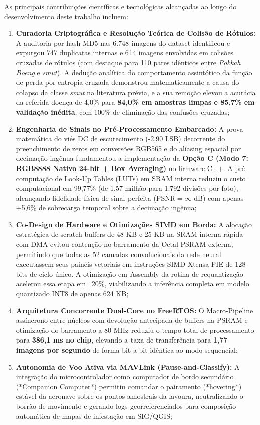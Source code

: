 As principais contribuições científicas e tecnológicas alcançadas ao longo do desenvolvimento deste trabalho incluem:
\begin{enumerate}
    \item \textbf{Curadoria Criptográfica e Resolução Teórica de Colisão de Rótulos:} A auditoria por hash MD5 nas 6.748 imagens do dataset identificou e expurgou 747 duplicatas internas e 614 imagens envolvidas em colisões cruzadas de rótulos (com destaque para 110 pares idênticos entre \textit{Pokkah Boeng} e \textit{smut}). A dedução analítica do comportamento assintótico da função de perda por entropia cruzada demonstrou matematicamente a causa do colapso da classe \textit{smut} na literatura prévia, e a sua remoção elevou a acurácia da referida doença de 4,0\% para \textbf{84,0\% em amostras limpas e 85,7\% em validação inédita}, com 100\% de eliminação das confusões cruzadas;
    \item \textbf{Engenharia de Sinais no Pré-Processamento Embarcado:} A prova matemática do viés DC de escurecimento (-2,90 LSB) decorrente do preenchimento de zeros em conversões RGB565 e do aliasing espacial por decimação ingênua fundamentou a implementação da \textbf{Opção C (Modo 7: RGB8888 Nativo 24-bit + Box Averaging)} no firmware C++. A pré-computação de Look-Up Tables (LUTs) em SRAM interna reduziu o custo computacional em 99,77\% (de 1,57 milhão para 1.792 divisões por foto), alcançando fidelidade física de sinal perfeita ($\text{PSNR} = \infty\text{ dB}$) com apenas +5,6\% de sobrecarga temporal sobre a decimação ingênua;
    \item \textbf{Co-Design de Hardware e Otimizações SIMD em Borda:} A alocação estratégica de scratch buffers de 48 KB e 25 KB na SRAM interna rápida com DMA evitou contenção no barramento da Octal PSRAM externa, permitindo que todas as 52 camadas convolucionais da rede neural executassem seus painéis vetoriais em instruções SIMD Xtensa PIE de 128 bits de ciclo único. A otimização em Assembly da rotina de requantização acelerou essa etapa em ~20\%, viabilizando a inferência completa em modelo quantizado INT8 de apenas 624 KB;
    \item \textbf{Arquitetura Concorrente Dual-Core no FreeRTOS:} O Macro-Pipeline assíncrono entre núcleos com devolução antecipada de buffers na PSRAM e otimização do barramento a 80 MHz reduziu o tempo total de processamento para \textbf{386,1 ms no chip}, elevando a taxa de transferência para \textbf{1,77 imagens por segundo} de forma bit a bit idêntica ao modo sequencial;
    \item \textbf{Autonomia de Voo Ativa via MAVLink (Pause-and-Classify):} A integração do microcontrolador como computador de bordo secundário (*Companion Computer*) permitiu comandar o pairamento (*hovering*) estável da aeronave sobre os pontos amostrais da lavoura, neutralizando o borrão de movimento e gerando logs georreferenciados para composição automática de mapas de infestação em SIG/QGIS;

\end{enumerate}
